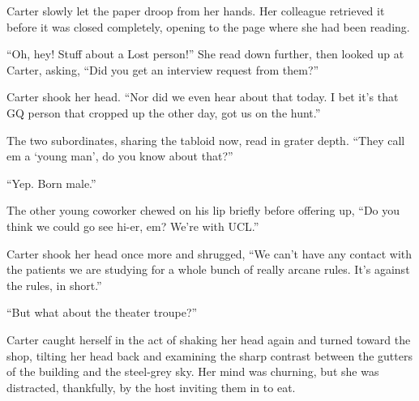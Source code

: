 Carter slowly let the paper droop from her hands.  Her colleague retrieved it before it was closed completely, opening to the page where she had been reading.

``Oh, hey!  Stuff about a Lost person!''  She read down further, then looked up at Carter, asking, ``Did you get an interview request from them?''

Carter shook her head.  ``Nor did we even hear about that today.  I bet it's that GQ person that cropped up the other day, got us on the hunt.''

The two subordinates, sharing the tabloid now, read in grater depth.  ``They call em a `young man', do you know about that?''

``Yep.  Born male.''

The other young coworker chewed on his lip briefly before offering up, ``Do you think we could go see hi-er, em?  We're with UCL.''

Carter shook her head once more and shrugged, ``We can't have any contact with the patients we are studying for a whole bunch of really arcane rules.  It's against the rules, in short.''

``But what about the theater troupe?''

Carter caught herself in the act of shaking her head again and turned toward the shop, tilting her head back and examining the sharp contrast between the gutters of the building and the steel-grey sky.  Her mind was churning, but she was distracted, thankfully, by the host inviting them in to eat.
